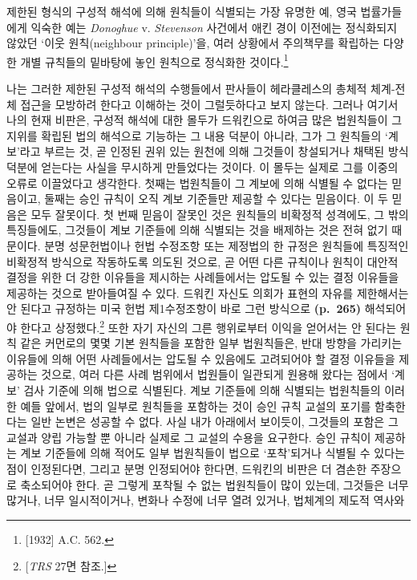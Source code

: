 제한된 형식의 구성적 해석에 의해 원칙들이 식별되는 가장 유명한 예, 영국
법률가들에게 익숙한 예는 \emph{Donoghue} v. \emph{Stevenson} 사건에서
애킨 경이 이전에는 정식화되지 않았던 ‘이웃 원칙(neighbour principle)’을,
여러 상황에서 주의책무를 확립하는 다양한 개별 규칙들의 밑바탕에 놓인
원칙으로 정식화한 것이다.\footnote{{[}1932{]} A.C. 562.}

나는 그러한 제한된 구성적 해석의 수행들에서 판사들이 헤라클레스의 총체적
체계-전체 접근을 모방하려 한다고 이해하는 것이 그럴듯하다고 보지 않는다.
그러나 여기서 나의 현재 비판은, 구성적 해석에 대한 몰두가 드워킨으로
하여금 많은 법원칙들이 그 지위를 확립된 법의 해석으로 기능하는 그 내용
덕분이 아니라, 그가 그 원칙들의 ‘계보’라고 부르는 것, 곧 인정된 권위
있는 원천에 의해 그것들이 창설되거나 채택된 방식 덕분에 얻는다는 사실을
무시하게 만들었다는 것이다. 이 몰두는 실제로 그를 이중의 오류로
이끌었다고 생각한다. 첫째는 법원칙들이 그 계보에 의해 식별될 수 없다는
믿음이고, 둘째는 승인 규칙이 오직 계보 기준들만 제공할 수 있다는
믿음이다. 이 두 믿음은 모두 잘못이다. 첫 번째 믿음이 잘못인 것은
원칙들의 비확정적 성격에도, 그 밖의 특징들에도, 그것들이 계보 기준들에
의해 식별되는 것을 배제하는 것은 전혀 없기 때문이다. 분명 성문헌법이나
헌법 수정조항 또는 제정법의 한 규정은 원칙들에 특징적인 비확정적
방식으로 작동하도록 의도된 것으로, 곧 어떤 다른 규칙이나 원칙이 대안적
결정을 위한 더 강한 이유들을 제시하는 사례들에서는 압도될 수 있는 결정
이유들을 제공하는 것으로 받아들여질 수 있다. 드워킨 자신도 의회가 표현의
자유를 제한해서는 안 된다고 규정하는 미국 헌법 제1수정조항이 바로 그런
방식으로 \textbf{(p.~265)} 해석되어야 한다고 상정했다.\footnote{{[}\emph{TRS}
  27면 참조.{]}} 또한 자기 자신의 그른 행위로부터 이익을 얻어서는 안
된다는 원칙 같은 커먼로의 몇몇 기본 원칙들을 포함한 일부 법원칙들은,
반대 방향을 가리키는 이유들에 의해 어떤 사례들에서는 압도될 수 있음에도
고려되어야 할 결정 이유들을 제공하는 것으로, 여러 다른 사례 범위에서
법원들이 일관되게 원용해 왔다는 점에서 ‘계보’ 검사 기준에 의해 법으로
식별된다. 계보 기준들에 의해 식별되는 법원칙들의 이러한 예들 앞에서,
법의 일부로 원칙들을 포함하는 것이 승인 규칙 교설의 포기를 함축한다는
일반 논변은 성공할 수 없다. 사실 내가 아래에서 보이듯이, 그것들의 포함은
그 교설과 양립 가능할 뿐 아니라 실제로 그 교설의 수용을 요구한다. 승인
규칙이 제공하는 계보 기준들에 의해 적어도 일부 법원칙들이 법으로
‘포착’되거나 식별될 수 있다는 점이 인정된다면, 그리고 분명 인정되어야
한다면, 드워킨의 비판은 더 겸손한 주장으로 축소되어야 한다. 곧 그렇게
포착될 수 없는 법원칙들이 많이 있는데, 그것들은 너무 많거나, 너무
일시적이거나, 변화나 수정에 너무 열려 있거나, 법체계의 제도적 역사와

